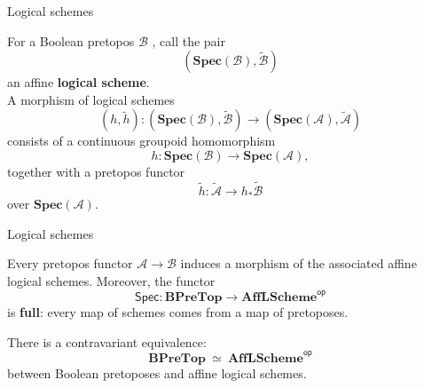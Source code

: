 \documentclass{beamer}
\newcommand{\B}{\ensuremath{\mathcal{B}}}
\newcommand{\myemph}[1]{\textbf{#1}}    %
\begin{document}
\begin{frame}{Logical schemes}

For a Boolean pretopos $\B$ , call the pair $$(\mathbf{Spec}(\mathcal{B}), \tilde{\mathcal{B}})$$ an affine \myemph{logical scheme}.  \\

A morphism of logical schemes
\[
(h, \tilde{h}) : (\mathbf{Spec}(\mathcal{B}), \tilde{\mathcal{B}}) \to (\mathbf{Spec}(\mathcal{A}), \tilde{\mathcal{A}})
\]
consists of a continuous groupoid homomorphism 
\[
h : \mathbf{Spec}(\mathcal{B}) \to \mathbf{Spec}(\mathcal{A}),
\]
together with a pretopos functor 
\[
\tilde{h} : \tilde{\mathcal{A}} \to h_*\tilde{\mathcal{B}}
\]
over $\mathbf{Spec}(\mathcal{A})$.

\end{frame}
\begin{frame}{Logical schemes}

\begin{theorem}[A.-Breiner 2012]
Every pretopos functor $\mathcal{A} \to \mathcal{B}$ induces a morphism of the associated affine logical schemes.  Moreover, the  functor
\[
\mathsf{Spec} : \mathbf{BPreTop} \longrightarrow \mathbf{AffLScheme}^{\mathsf{op}}
\]
is \myemph{full}: every map of schemes comes from a map of pretoposes.
\end{theorem}

\begin{corollary}
There is a contravariant equivalence:
\[
\mathbf{BPreTop} \ \simeq\ \mathbf{AffLScheme}^{\mathsf{op}}
\]
between Boolean pretoposes and affine logical schemes.
\end{corollary}

\end{frame}
\end{document}
